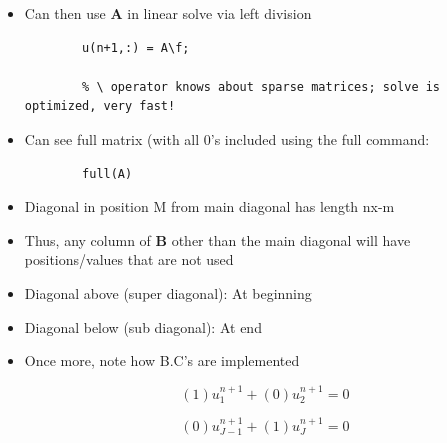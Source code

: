 \begin{itemize}
    \begin{verbatim}
        % Initialize storage for sparse matrix and RHS

        dl = zeros(nx, 1);
        d = zeros(nx,1);
        du = zeros(nx,1);
        f = zeros(nx,1);

        % Set up tridiagonal system

        dl = -1.0/dx^2 * ones(nx,1);
        d = (1.0/dt * 2.0/dx^2) * ones(nx,1);
        du = dl;

        % Fix up boundary cases

        % Left B.C.
        d(1) = 1.0;
        du(2) = 0.0;

        % Right B.C.
        dl(nx-1) = 0.0;
        d(nx) = 1.0;

        % Define sparse matrix
        % B is [dl d du]
        % -1:1 is which diagonals 
        % nx, nx is dimensions

        A = spdiags([dl d du], -1:1, nx, nx)

        % Define RHS vector 

        f(2:nx-1) = u(n, 2:nx-1)/dt;
        f(1) = 0;
        f(nx) = 0;
    \end{verbatim}

    \item Can then use $\mathbf{A}$ in linear solve via left division

    \begin{verbatim}
        u(n+1,:) = A\f;

        % \ operator knows about sparse matrices; solve is optimized, very fast!
    \end{verbatim}

    \item Can see full matrix (with all 0's included using the full command:

    \begin{verbatim}
        full(A)
    \end{verbatim}

    \item Diagonal in position M from main diagonal has length nx-m
    \item Thus, any column of $\mathbf{B}$ other than the main diagonal will have positions/values that are not used

    \item Diagonal above (super diagonal): At beginning
    \item Diagonal below (sub diagonal): At end

    \item Once more, note how B.C's are implemented

    \[(1)u_1^{n+1} + (0) u_2^{n+1} = 0\]

    \[ (0) u_{J-1}^{n+1} + (1) u_{J}^{n+1} = 0\]
\end{itemize}


